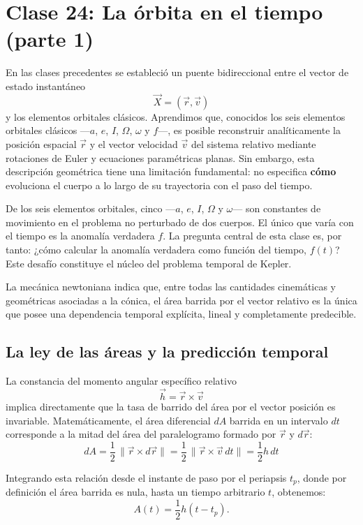 \chapter{Clase 24: La órbita en el tiempo (parte 1)}

En las clases precedentes se estableció un puente bidireccional entre el vector de estado instantáneo
\[
\vec{X} = (\vec{r},\vec{v})
\]
y los elementos orbitales clásicos. Aprendimos que, conocidos los seis elementos orbitales clásicos —\(a\), \(e\), \(I\), \(\Omega\), \(\omega\) y \(f\)—, es posible reconstruir analíticamente la posición espacial \(\vec{r}\) y el vector velocidad \(\vec{v}\) del sistema relativo mediante rotaciones de Euler y ecuaciones paramétricas planas. Sin embargo, esta descripción geométrica tiene una limitación fundamental: no especifica \textbf{cómo} evoluciona el cuerpo a lo largo de su trayectoria con el paso del tiempo.

De los seis elementos orbitales, cinco —\(a\), \(e\), \(I\), \(\Omega\) y \(\omega\)— son constantes de movimiento en el problema no perturbado de dos cuerpos. El único que varía con el tiempo es la anomalía verdadera \(f\). La pregunta central de esta clase es, por tanto: ¿cómo calcular la anomalía verdadera como función del tiempo, \(f(t)\)? Este desafío constituye el núcleo del problema temporal de Kepler.

La mecánica newtoniana indica que, entre todas las cantidades cinemáticas y geométricas asociadas a la cónica, el área barrida por el vector relativo es la única que posee una dependencia temporal explícita, lineal y completamente predecible.

\section{La ley de las áreas y la predicción temporal}
La constancia del momento angular específico relativo
\[
\vec{h} = \vec{r} \times \vec{v}
\]
implica directamente que la tasa de barrido del área por el vector posición es invariable. Matemáticamente, el área diferencial \(dA\) barrida en un intervalo \(dt\) corresponde a la mitad del área del paralelogramo formado por \(\vec{r}\) y \(d\vec{r}\):
\[
 dA = \frac{1}{2}\,\|\vec{r} \times d\vec{r}\| = \frac{1}{2}\,\|\vec{r} \times \vec{v}\,dt\| = \frac{1}{2}h\,dt
\]

Integrando esta relación desde el instante de paso por el periapsis \(t_p\), donde por definición el área barrida es nula, hasta un tiempo arbitrario \(t\), obtenemos:
\[
 A(t) = \frac{1}{2}h(t-t_p).
\]

